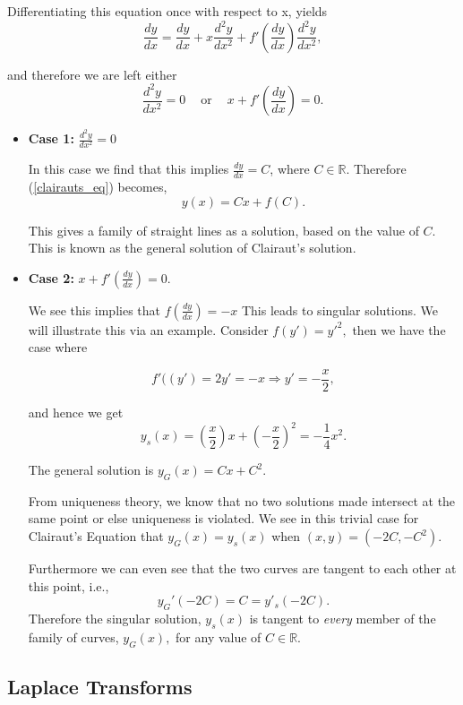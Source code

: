 Differentiating this equation once with respect to x, yields
$$\frac{dy}{dx} = \frac{dy}{dx} + x\frac{d^2y}{dx^2} + f'\left( \frac{dy}{dx} \right) \frac{d^2y}{dx^2},$$

and therefore we are left either $$\frac{d^2y}{dx^2} = 0 \ \ \ \ \mbox{ or } \ \ \ \ x + f'\left( \frac{dy}{dx} \right) = 0.$$

\begin{itemize}
\item {\bf{Case 1:}} $\frac{d^2y}{dx^2} = 0$

In this case we find that this implies $\frac{dy}{dx} = C$, where $C\in\mathbb{R}.$ Therefore (\ref{clairauts_eq}) becomes, $$y(x) = Cx + f(C).$$

This gives a family of straight lines as a solution, based on the value of $C$. This is known as the general solution of Clairaut's solution. 

\item {\bf{Case 2:}} $x + f'\left( \frac{dy}{dx} \right) = 0.$

We see this implies that $f\left( \frac{dy}{dx} \right) = -x$ This leads to singular solutions. We will illustrate this via an example. Consider $f(y') = y'^2,$ then we have the case where

$$f'(\left( y' \right) = 2y' = -x \Rightarrow y' = -\frac{x}{2},$$

and hence we get $$y_s(x) = (\frac{x}{2})x + \left(-\frac{x}{2}\right)^2 = -\frac{1}{4} x^2.$$

The general solution is $y_G(x) = Cx + C^2$.

From uniqueness theory, we know that no two solutions made intersect at the same point or else uniqueness is violated. We see in this trivial case for Clairaut's Equation that $y_G(x) = y_s(x)$ when $(x,y) = (-2C,-C^2).$

Furthermore we can even see that the two curves are tangent to each other at this point, i.e., $$y_G'(-2C) = C = y'_s(-2C).$$ Therefore the singular solution, $y_s(x)$ is tangent to \emph{every} member of the family of curves, $y_G(x),$ for any value of $C\in\mathbb{R}.$

\end{itemize}


%
%

\subsection{Laplace Transforms}

